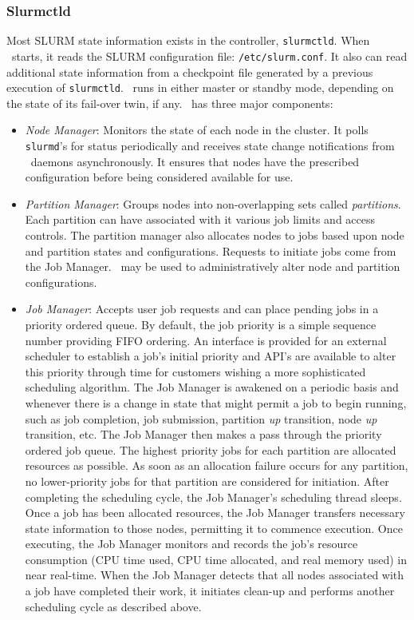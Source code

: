 \subsubsection{Slurmctld}

Most SLURM state information exists in the controller, {\tt slurmctld}.
When \slurmctld\ starts, it reads the SLURM configuration file: 
{\tt /etc/slurm.conf}.  It also can read additional state information
from a checkpoint file generated by a previous execution of {\tt slurmctld}.
\slurmctld\ runs in either master or standby mode, depending on the
state of its fail-over twin, if any.
\slurmctld\ has three major components:

\begin{itemize}
\item {\em Node Manager}: Monitors the state of each node in
the cluster.  It polls {\tt slurmd}'s for status periodically and
receives state change notifications from \slurmd\ daemons asynchronously.
It ensures that nodes have the prescribed configuration before being 
considered available for use.

\item {\em Partition Manager}: Groups nodes into non-overlapping sets called
{\em partitions}. Each partition can have associated with it various job
limits and access controls.  The partition manager also allocates nodes
to jobs based upon node and partition states and configurations. Requests
to initiate jobs come from the Job Manager.  \scontrol\ may be used
to administratively alter node and partition configurations.

\item {\em Job Manager}: Accepts user job requests and can
place pending jobs in a priority ordered queue. By default, the job
priority is a simple sequence number providing FIFO ordering.
An interface is provided for an external scheduler to establish a job's
initial priority and API's are available to alter this priority through
time for customers wishing a more sophisticated scheduling algorithm.
The Job Manager is awakened on a periodic basis and whenever there
is a change in state that might permit a job to begin running, such
as job completion, job submission, partition {\em up} transition,
node {\em up} transition, etc.  The Job Manager then makes a pass
through the priority ordered job queue. The highest priority jobs 
for each partition are allocated resources as possible. As soon as an 
allocation failure occurs for any partition, no lower-priority jobs for 
that partition are considered for initiation. 
After completing the scheduling cycle, the Job Manager's scheduling
thread sleeps.  Once a job has been allocated resources, the Job Manager
transfers necessary state information to those nodes, permitting it 
to commence execution.  Once executing, the Job Manager monitors and records
the job's resource consumption (CPU time used, CPU time allocated, and
real memory used) in near real-time.  When the Job Manager detects that
all nodes associated with a job have completed their work, it initiates
clean-up and performs another scheduling cycle as described above.


\end{itemize}
